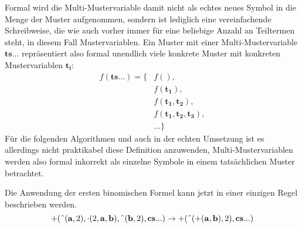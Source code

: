 Formal wird die Multi-Mustervariable damit nicht als echtes neues Symbol in die Menge der Muster aufgenommen, sondern ist lediglich eine vereinfachende Schreibweise, die wie auch vorher immer für eine beliebige Anzahl an Teiltermen steht, in diesem Fall Mustervariablen. Ein Muster mit einer Multi-Mustervariable $\mathbf{ts...}$ repräsentiert also formal unendlich viele konkrete Muster mit konkreten Mustervariablen $\mathbf{t_i}$:
\begin{equation*}
    \begin{split}
    		f(\mathbf{ts...}) = \{&f(), \\
    		&f(\mathbf{t_1}),\\
    		&f(\mathbf{t_1}, \mathbf{t_2}), \\
    		&f(\mathbf{t_1}, \mathbf{t_2}, \mathbf{t_3}), \\
    		&\dots \}    		
    \end{split}
\end{equation*}
Für die folgenden Algorithmen und auch in der echten Umsetzung ist es allerdings nicht praktikabel diese Definition anzuwenden, Multi-Mustervariablen werden also formal inkorrekt als einzelne Symbole in einem tatsächlichen Muster betrachtet.

Die Anwendung der ersten binomischen Formel kann jetzt in einer einzigen Regel beschrieben werden.
$$+(\string^(\mathbf a, 2), \cdot(2, \mathbf a, \mathbf b), \string^(\mathbf b, 2), \mathbf{cs...}) \rightarrow +(\string^(+(\mathbf a, \mathbf b), 2), \mathbf{cs...})$$






